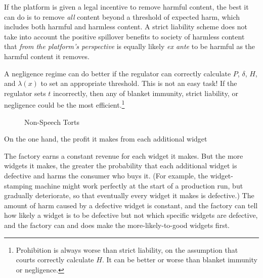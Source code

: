 If the platform is given a legal incentive to remove harmful content, the best it can do is to remove \emph{all} content beyond a threshold of expected harm, which includes both harmful and harmless content.  A strict liability scheme does not take into account the positive spillover benefits to society of harmless content that \emph{from the platform's perspective} is equally likely \emph{ex ante} to be harmful as the harmful content it removes. 

A negligence regime can do better if the regulator can correctly calculate $P$, $\delta$, $H$, and $\lambda(x)$ to set an appropriate threshold. This is not an easy task! If the regulator sets $t$ incorrectly, then any of blanket immunity, strict liability, or negligence could be the most efficient.\footnote{Prohibition is always worse than strict liability, on the assumption that courts correctly calculate $H$. It can be better or worse than blanket immunity or negligence.}




\begin{figure}[ht]
    \centering
{}
    \caption{Non-Speech Torts}
    \label{fig:nonspeech}
\end{figure}

On the one hand, the profit it makes from each additional widget 

The factory earns a constant revenue for each widget it makes. But the more widgets it makes, the greater the probability that each additional widget is defective and harms the consumer who buys it. (For example, the widget-stamping machine might work perfectly at the start of a production run, but gradually deteriorate, so that eventually every widget it makes is defective.) The amount of harm caused by a defective widget is constant, and the factory can tell how likely a widget is to be defective but not which specific widgets are defective, and the factory can and does make the more-likely-to-good widgets first.


